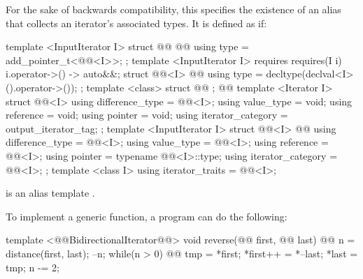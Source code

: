 \begin{addedblock}
\pnum
For the sake of backwards compatibility, this  specifies the existence of an 
alias that collects an iterator's associated types. It is defined as if:

%
\begin{codeblock}
  template <InputIterator I> struct @@ {        @\newtxt{// \expos}@
    using type = add_pointer_t<@@<I>>;
  };
  template <InputIterator I>
    requires requires(I i) { { i.operator->() } -> auto&&; }
  struct @@<I> {                                    @\newtxt{// \expos}@
    using type = decltype(declval<I>().operator->());
  };
  template <class> struct @@ { };                @\newtxt{// \expos}@
  template <Iterator I> struct @@<I> {
    using difference_type = @@<I>;
    using value_type = void;
    using reference = void;
    using pointer = void;
    using iterator_category = output_iterator_tag;
  };
  template <InputIterator I> struct @@<I> {  @\newtxt{// \expos}@
    using difference_type = @@<I>;
    using value_type = @@<I>;
    using reference = @@<I>;
    using pointer = typename @@<I>::type;
    using iterator_category = @@<I>;
  };
  template <class I>
    using iterator_traits = @@<I>;
\end{codeblock}

\pnum
\enternote
{} is an alias template
.
\exitnote

\end{addedblock}

\pnum
\enterexample
To implement a generic
function, a \Cpp program can do the following:

\begin{codeblock}
template <@@BidirectionalIterator@@>
void reverse(@@ first, @@ last) {
  @@ n =
    distance(first, last);
  --n;
  while(n > 0) {
    @@
      tmp = *first;
    *first++ = *--last;
    *last = tmp;
    n -= 2;
  }
}
\end{codeblock}
\exitexample

